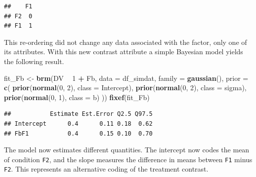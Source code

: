 \documentclass[12pt,]{krantz}
\newenvironment{Shaded}{\begin{snugshade}}{\end{snugshade}}
\newcommand{\DataTypeTok}[1]{\textcolor[rgb]{0.13,0.29,0.53}{#1}}
\newcommand{\DecValTok}[1]{\textcolor[rgb]{0.00,0.00,0.81}{#1}}
\newcommand{\KeywordTok}[1]{\textcolor[rgb]{0.13,0.29,0.53}{\textbf{#1}}}
\newcommand{\NormalTok}[1]{#1}
\newcommand{\OperatorTok}[1]{\textcolor[rgb]{0.81,0.36,0.00}{\textbf{#1}}}
\newcommand{\StringTok}[1]{\textcolor[rgb]{0.31,0.60,0.02}{#1}}
\theoremstyle{definition}
\theoremstyle{definition}
\theoremstyle{definition}
\theoremstyle{remark}
\begin{document}
\begin{Shaded}
\end{Shaded}

\begin{verbatim}
##    F1
## F2  0
## F1  1
\end{verbatim}

\noindent
This re-ordering did not change any data associated with the factor, only one of its attributes. With this new contrast attribute a simple Bayesian model yields the following result.

\begin{Shaded}
\begin{Highlighting}[]
\NormalTok{fit_Fb <-}\StringTok{ }\KeywordTok{brm}\NormalTok{(DV }\OperatorTok{~}\StringTok{ }\DecValTok{1} \OperatorTok{+}\StringTok{ }\NormalTok{Fb,}
                 \DataTypeTok{data =}\NormalTok{ df_simdat,}
                 \DataTypeTok{family =} \KeywordTok{gaussian}\NormalTok{(),}
                 \DataTypeTok{prior =} \KeywordTok{c}\NormalTok{(}
                     \KeywordTok{prior}\NormalTok{(}\KeywordTok{normal}\NormalTok{(}\DecValTok{0}\NormalTok{, }\DecValTok{2}\NormalTok{), }\DataTypeTok{class =}\NormalTok{ Intercept),}
                     \KeywordTok{prior}\NormalTok{(}\KeywordTok{normal}\NormalTok{(}\DecValTok{0}\NormalTok{, }\DecValTok{2}\NormalTok{), }\DataTypeTok{class =}\NormalTok{ sigma),}
                     \KeywordTok{prior}\NormalTok{(}\KeywordTok{normal}\NormalTok{(}\DecValTok{0}\NormalTok{, }\DecValTok{1}\NormalTok{), }\DataTypeTok{class =}\NormalTok{ b)}
\NormalTok{                 )) }
\KeywordTok{fixef}\NormalTok{(fit_Fb)}
\end{Highlighting}
\end{Shaded}

\begin{verbatim}
##           Estimate Est.Error Q2.5 Q97.5
## Intercept      0.4      0.11 0.18  0.62
## FbF1           0.4      0.15 0.10  0.70
\end{verbatim}

The model now estimates different quantities. The intercept now codes the mean of condition \texttt{F2}, and the slope measures the difference in means between \texttt{F1} minus \texttt{F2}. This represents an alternative coding of the treatment contrast.
\end{document}
